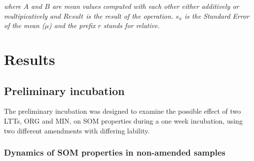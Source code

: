 \documentclass[12pt]{report}
\newlength{\SpaceAfterUnit}
\newcommand{\respunit}{$ mg\ CO_2$\text{-}$C * kg^{\text{-}1} * day^{\text{\text{-}}1}$ \hspace*{\SpaceAfterUnit}}
\newcommand{\genericunit}{$ mg * kg\ soil^{\text{-}1}$ \hspace*{\SpaceAfterUnit}}
\begin{document}
   		\begin{adjustwidth}{50pt}{50pt}
    		\begin{footnotesize}
    			\textit{where $ A $ and $ B $ are mean values computed with each other either additively or multipicatively and $ Result $ is the result  of the operation. $ s_{\bar{x}} $ is the Standard Error of the mean ($ \mu $) and the prefix $ r $ stands for relative.
    		}
    		\end{footnotesize}
    	\end{adjustwidth} 
    
    
    
    
	
	\chapter{Results}
	   





\section{Preliminary incubation}
The preliminary incubation was designed to examine the possible effect of two LTTs, ORG and MIN, on SOM properties during a one week incubation, using two different amendments with differing lability. 

\subsection{Dynamics of SOM properties in non-amended samples}
\end{document}
